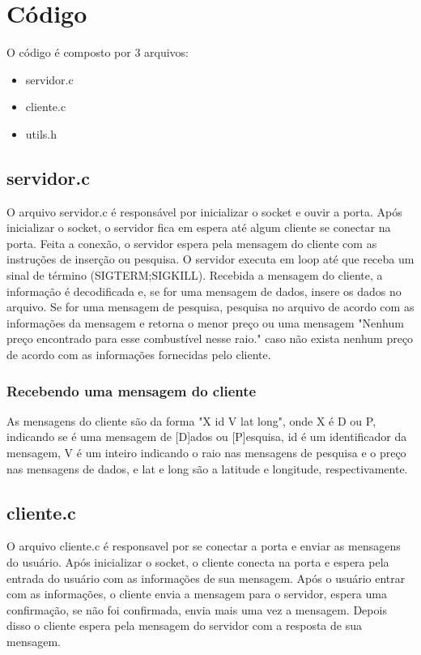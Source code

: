 \documentclass[11pt]{article}
\begin{document}
\section{Código}
O código é composto por 3 arquivos:
\begin{itemize}
\item servidor.c
\item cliente.c
\item utils.h
\end{itemize}

\subsection{servidor.c}
O arquivo servidor.c é responsável por inicializar o socket e ouvir a porta.
Após inicializar o socket, o servidor fica em espera até algum cliente se conectar na porta.
Feita a conexão, o servidor espera pela mensagem do cliente com as instruções de inserção ou pesquisa.
O servidor executa em loop até que receba um sinal de término (SIGTERM;SIGKILL).
Recebida a mensagem do cliente, a informação é decodificada e, se for uma mensagem de dados, insere os dados no arquivo. Se for uma mensagem de pesquisa, pesquisa no arquivo de acordo com as informações da mensagem e retorna o menor preço ou uma mensagem "Nenhum preço encontrado para esse combustível nesse raio." caso não exista nenhum preço de acordo com as informações fornecidas pelo cliente.

\subsubsection{Recebendo uma mensagem do cliente}
As mensagens do cliente são da forma "X id V lat long", onde X é D ou P, indicando se é uma mensagem de [D]ados ou [P]esquisa, id é um identificador da mensagem, V é um inteiro indicando o raio nas mensagens de pesquisa e o preço nas mensagens de dados, e lat e long são a latitude e longitude, respectivamente.

\subsection{cliente.c}
O arquivo cliente.c é responsavel por se conectar a porta e enviar as mensagens do usuário.
Após inicializar o socket, o cliente conecta na porta e espera pela entrada do usuário com as informações de sua mensagem.
Após o usuário entrar com as informações, o cliente envia a mensagem para o servidor, espera uma confirmação, se não foi confirmada, envia mais uma vez a mensagem.
Depois disso o cliente espera pela mensagem do servidor com a resposta de sua mensagem.
\end{document}
